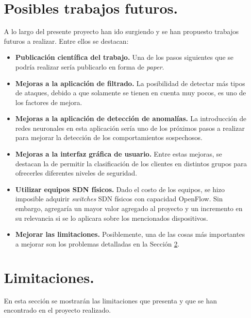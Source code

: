 \section{Posibles trabajos futuros.}

A lo largo del presente proyecto han ido surgiendo y se han propuesto trabajos futuros a realizar. Entre ellos se destacan:

\begin{itemize}
    
\item{\textbf{Publicación científica del trabajo.} Una de los pasos siguientes que se podría realizar sería publicarlo en forma de \textit{paper}.}
\item{\textbf{Mejoras a la aplicación de filtrado.} La posibilidad de detectar más tipos de ataques, debido a que solamente se tienen en cuenta muy pocos, es uno de los factores de mejora.}
\item{\textbf{Mejoras a la aplicación de detección de anomalías.} La introducción de redes neuronales en esta aplicación sería uno de los próximos pasos a realizar para mejorar la detección de los comportamientos sospechosos.}
\item{\textbf{Mejoras a la interfaz gráfica de usuario.} Entre estas mejoras, se destacan la de permitir la clasificación de los clientes en distintos grupos para ofrecerles diferentes niveles de seguridad.}
\item{\textbf{Utilizar equipos SDN físicos.} Dado el costo de los equipos, se hizo imposible adquirir \textit{switches} SDN físicos con capacidad OpenFlow. Sin embargo, agregaría un mayor valor agregado al proyecto y un incremento en su relevancia si se lo aplicara sobre los mencionados dispositivos.}
\item {\textbf{Mejorar las limitaciones.} Posiblemente, una de las cosas más importantes a mejorar son los problemas detalladas en la Sección \ref{sec:limitaciones}.}

\end{itemize}


\section{Limitaciones.} \label{sec:limitaciones}

En esta sección se mostrarán las limitaciones que presenta y que se han encontrado en el proyecto realizado.

